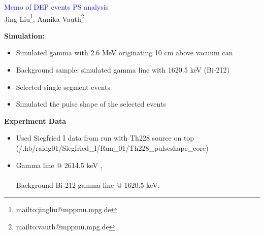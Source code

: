 \documentclass[landscape]{slides}
\begin{document}
\begin{slide}
\begin{center}
\textcolor{blue}{Memo of DEP events PS analysis}\\
Jing Liu\footnote{mailto:jingliu@mppmu.mpg.de},
Annika Vauth\footnote{mailto:vauth@mppmu.mpg.de}

\end{center}

\end{slide}


\begin{slide}

\textbf{Simulation:}

\begin{itemize}

\item Simulated gamma with 2.6 MeV originating 10 cm above vacuum can

\item Background sample: simulated gamma line with 1620.5 keV (Bi-212)

\item Selected single segment events

\item Simulated the pulse shape of the selected events

\end{itemize}

\end{slide}

\begin{slide}

\textbf{Experiment Data}

\begin{itemize}

\item Used Siegfried I data from run with Th228 source on top
	\\ (/.hb/raidg01/Siegfried\_I/Run\_01/Th228\_pulseshape\_core)

\item Gamma line @ 2614.5 keV , \\
	\\ Background Bi-212 gamma line @ 1620.5 keV.

\end{itemize}

\end{slide}
\end{document}

